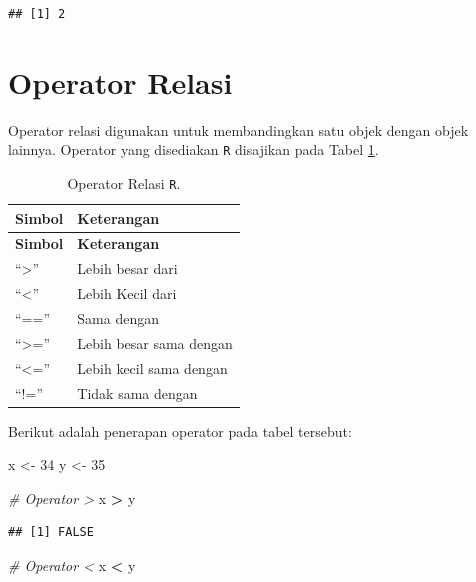 \documentclass[
]{book}
\newenvironment{Shaded}{\begin{snugshade}}{\end{snugshade}}
\newcommand{\CommentTok}[1]{\textcolor[rgb]{0.56,0.35,0.01}{\textit{#1}}}
\newcommand{\DecValTok}[1]{\textcolor[rgb]{0.00,0.00,0.81}{#1}}
\newcommand{\NormalTok}[1]{#1}
\newcommand{\OtherTok}[1]{\textcolor[rgb]{0.56,0.35,0.01}{#1}}
\newcommand{\SpecialCharTok}[1]{\textcolor[rgb]{0.81,0.36,0.00}{\textbf{#1}}}
\theoremstyle{definition}
\theoremstyle{definition}
\theoremstyle{definition}
\theoremstyle{definition}
\theoremstyle{remark}
\begin{document}
\begin{verbatim}
## [1] 2
\end{verbatim}

\hypertarget{relationoperators}{%
\section{Operator Relasi}\label{relationoperators}}

Operator relasi digunakan untuk membandingkan satu objek dengan objek lainnya. Operator yang disediakan \texttt{R} disajikan pada Tabel \ref{tab:oprelasi}.

\begin{longtable}[]{@{}ll@{}}
\caption{\label{tab:oprelasi} Operator Relasi \texttt{R}.}\tabularnewline
\toprule\noalign{}
\textbf{Simbol} & \textbf{Keterangan} \\
\midrule\noalign{}
\endfirsthead
\toprule\noalign{}
\textbf{Simbol} & \textbf{Keterangan} \\
\midrule\noalign{}
\endhead
\bottomrule\noalign{}
\endlastfoot
``\textgreater{}'' & Lebih besar dari \\
``\textless{}'' & Lebih Kecil dari \\
``=='' & Sama dengan \\
``\textgreater='' & Lebih besar sama dengan \\
``\textless='' & Lebih kecil sama dengan \\
``!='' & Tidak sama dengan \\
\end{longtable}

Berikut adalah penerapan operator pada tabel tersebut:

\begin{Shaded}
\begin{Highlighting}[]
\NormalTok{x }\OtherTok{\textless{}{-}} \DecValTok{34}
\NormalTok{y }\OtherTok{\textless{}{-}} \DecValTok{35}

\CommentTok{\# Operator \textgreater{}}
\NormalTok{x }\SpecialCharTok{\textgreater{}}\NormalTok{ y}
\end{Highlighting}
\end{Shaded}

\begin{verbatim}
## [1] FALSE
\end{verbatim}

\begin{Shaded}
\begin{Highlighting}[]
\CommentTok{\# Operator \textless{}}
\NormalTok{x }\SpecialCharTok{\textless{}}\NormalTok{ y}
\end{Highlighting}
\end{Shaded}
\end{document}

